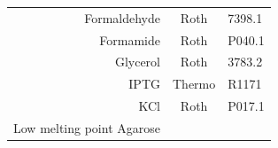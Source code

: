 \documentclass[11pt,singlespacinge,twoside]{reedthesis} %
\theoremstyle{definition}
\theoremstyle{definition}
\theoremstyle{definition}
\theoremstyle{remark}
\begin{document}
\begin{longtable}[]{@{}rcl@{}}
\begin{minipage}[t]{0.29\columnwidth}
Formaldehyde\strut
\end{minipage} & \begin{minipage}[t]{0.33\columnwidth}\centering
Roth\strut
\end{minipage} & \begin{minipage}[t]{0.29\columnwidth}\raggedright
7398.1\strut
\end{minipage}\tabularnewline
\begin{minipage}[t]{0.29\columnwidth}\raggedleft
Formamide\strut
\end{minipage} & \begin{minipage}[t]{0.33\columnwidth}\centering
Roth\strut
\end{minipage} & \begin{minipage}[t]{0.29\columnwidth}\raggedright
P040.1\strut
\end{minipage}\tabularnewline
\begin{minipage}[t]{0.29\columnwidth}\raggedleft
Glycerol\strut
\end{minipage} & \begin{minipage}[t]{0.33\columnwidth}\centering
Roth\strut
\end{minipage} & \begin{minipage}[t]{0.29\columnwidth}\raggedright
3783.2\strut
\end{minipage}\tabularnewline
\begin{minipage}[t]{0.29\columnwidth}\raggedleft
IPTG\strut
\end{minipage} & \begin{minipage}[t]{0.33\columnwidth}\centering
Thermo\strut
\end{minipage} & \begin{minipage}[t]{0.29\columnwidth}\raggedright
R1171\strut
\end{minipage}\tabularnewline
\begin{minipage}[t]{0.29\columnwidth}\raggedleft
KCl\strut
\end{minipage} & \begin{minipage}[t]{0.33\columnwidth}\centering
Roth\strut
\end{minipage} & \begin{minipage}[t]{0.29\columnwidth}\raggedright
P017.1\strut
\end{minipage}\tabularnewline
\begin{minipage}[t]{0.29\columnwidth}\raggedleft
Low melting point Agarose\strut
\end{minipage} & \begin{minipage}[t]{0.33\columnwidth}\centering

\end{minipage}
\end{longtable}
\end{document}

